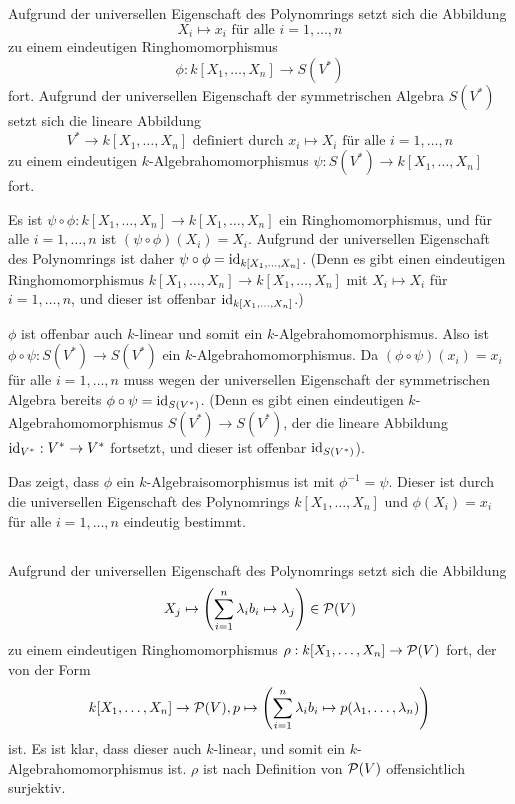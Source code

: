 \documentclass[a4paper,10pt]{article}
\begin{document}
\subsection{}
Aufgrund der universellen Eigenschaft des Polynomrings setzt sich die Abbildung
\[
 X_i \mapsto x_i \text{ für alle } i=1,\ldots,n
\]
zu einem eindeutigen Ringhomomorphismus
\[
 \phi : k[X_1, \ldots, X_n] \to S(V^*)
\]
fort. Aufgrund der universellen Eigenschaft der symmetrischen Algebra $S(V^*)$ setzt sich die lineare Abbildung
\[
 V^* \to k[X_1, \ldots, X_n] \text{ definiert durch } x_i \mapsto X_i \text{ für alle } i=1,\ldots,n
\]
zu einem eindeutigen $k$-Algebrahomomorphismus $\psi : S(V^*) \to k[X_1, \ldots, X_n]$ fort.

Es ist $\psi \circ \phi : k[X_1, \ldots, X_n] \to k[X_1, \ldots, X_n]$ ein Ringhomomorphismus, und für alle $i=1,\ldots,n$ ist $(\psi \circ \phi)(X_i) = X_i$. Aufgrund der universellen Eigenschaft des Polynomrings ist daher $\psi \circ \phi = \operatorname{id}_{k[X_1, \ldots, X_n]}$. (Denn es gibt einen eindeutigen Ringhomomorphismus $k[X_1, \ldots, X_n] \to k[X_1, \ldots, X_n]$ mit $X_i \mapsto X_i$ für $i=1,\ldots,n$, und dieser ist offenbar $\operatorname{id}_{k[X_1, \ldots, X_n]}$.)

$\phi$ ist offenbar auch $k$-linear und somit ein $k$-Algebrahomomorphismus. Also ist $\phi \circ \psi : S(V^*) \to S(V^*)$ ein $k$-Algebrahomomorphismus. Da $(\phi \circ \psi)(x_i) = x_i$ für alle $i=1,\ldots,n$ muss wegen der universellen Eigenschaft der symmetrischen Algebra bereits $\phi \circ \psi = \operatorname{id}_{S(V^*)}$. (Denn es gibt einen eindeutigen $k$-Algebraho\-mo\-mor\-phis\-mus $S(V^*) \to S(V^*)$, der die lineare Abbildung $\operatorname{id}_{V^*} : V^* \to V^*$ fortsetzt, und dieser ist offenbar $\operatorname{id}_{S(V^*)}$).

Das zeigt, dass $\phi$ ein $k$-Algebraisomorphismus ist mit $\phi^{-1} = \psi$. Dieser ist durch die universellen Eigenschaft des Polynomrings $k[X_1, \ldots, X_n]$ und $\phi(X_i) = x_i$ für alle $i=1,\ldots,n$ eindeutig bestimmt.


\subsection{}
Aufgrund der universellen Eigenschaft des Polynomrings setzt sich die Abbildung
\[
 X_j \mapsto \left(\sum_{i=1}^n \lambda_i b_i \mapsto \lambda_j\right) \in \mathcal{P}(V)
\]
zu einem eindeutigen Ringhomomorphismus $\rho : k[X_1, \ldots, X_n] \to \mathcal{P}(V)$ fort, der von der Form
\[
 k[X_1, \ldots, X_n] \to \mathcal{P}(V),
 p \mapsto \left( \sum_{i=1}^n \lambda_i b_i \mapsto p(\lambda_1, \ldots, \lambda_n) \right)
\]
ist. Es ist klar, dass dieser auch $k$-linear, und somit ein $k$-Algebrahomomorphismus ist. $\rho$ ist nach Definition von $\mathcal{P}(V)$ offensichtlich surjektiv.
\end{document}
